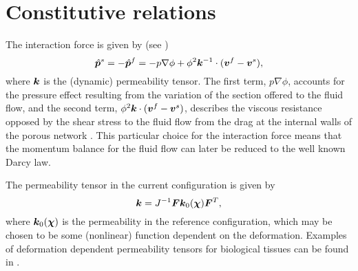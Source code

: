 \section{Constitutive relations}
\label{sec:constitutive}

The interaction force is given by (see \cite[eqn. (3.49)]{coussy2004poromechanics})
\begin{equation}
 \hat{\boldsymbol{p}}^{s}=-\hat{\boldsymbol{p}}^{f}=-p\nabla \phi + \phi^{2} \boldsymbol{k}^{-1}\cdot(\boldsymbol{v}^{f}-\boldsymbol{v}^{s}),
\end{equation}
where $\boldsymbol{k}$ is the (dynamic) permeability tensor.
The first term,  $p \nabla \phi$, accounts for the pressure effect resulting from the variation of the section offered to the fluid flow, and the second term,  $\phi^{2} \boldsymbol{k} \cdot (\boldsymbol{v}^{f}-\boldsymbol{v}^{s})$, describes the viscous resistance opposed by the shear stress to the fluid flow from the drag at the internal walls of the porous network \cite{coussy2004poromechanics}. This particular choice for the interaction force means that the momentum balance for the fluid flow can later be reduced to the well known Darcy law.

The permeability tensor in the current configuration is given by
\begin{equation}
 \boldsymbol{k}=J^{-1} \boldsymbol{F} \boldsymbol{k}_{0}(\boldsymbol{\chi}) \boldsymbol{F}^{T} ,
 \label{eqn:permeability_const}
\end{equation}
where $\boldsymbol{k}_{0}(\boldsymbol{\chi}) $ is the permeability in the reference configuration, which may be chosen to be some (nonlinear) function dependent on the deformation. Examples of deformation dependent permeability tensors for biological tissues can be found in \cite{kowalczyk1994modelling,holmes1990nonlinear,lai1980drag}.

